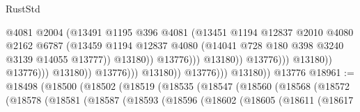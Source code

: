 \begin{lexlean}{RustStd}
\begin{coremodule}
                                                      @4081
                                                      @2004
                                                      (@13491
                                                        @1195
                                                        @396
                                                        @4081
                                                        (@13451
                                                          @1194
                                                          @12837
                                                          @2010
                                                          @4080
                                                          @2162
                                                          @6787
                                                          (@13459
                                                            @1194
                                                            @12837
                                                            @4080
                                                            (@14041
                                                              @728
                                                              @180
                                                              @398
                                                              @3240
                                                              @3139
                                                              @14055
                                                              @13777))
                                                          @13180))
                                                      @13776)))
                                                @13180))
                                            @13776)))
                                      @13180))
                                  @13776)))
                            @13180))
                        @13776)))
                  @13180))
              @13776)))
        @13180))
    @13776
@18961 := @18498
    (@18500
      (@18502
        (@18519
          (@18535
            (@18547
              (@18560
                (@18568
                  (@18572
                    (@18578
                      (@18581
                        (@18587
                          (@18593
                            (@18596
                              (@18602
                                (@18605
                                  (@18611
                                    (@18617

\end{coremodule}
\end{lexlean}
